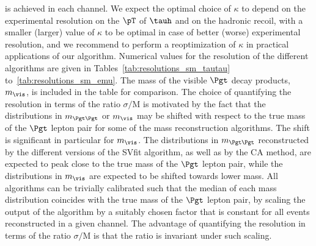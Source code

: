 is achieved in each channel.
We expect the optimal choice of $\kappa$ to depend on the experimental resolution on the $\pT$ of $\tauh$ and on the hadronic recoil,
with a smaller (larger) value of $\kappa$ to be optimal in case of better (worse) experimental resolution,
and we recommend to perform a reoptimization of $\kappa$ in practical applications of our algorithm.
Numerical values for the resolution of the different algorithms are given in Tables~\ref{tab:resolutions_sm_tautau} to~\ref{tab:resolutions_sm_emu}.
The mass of the visible $\Pgt$ decay products, $m_{\vis}$, is included in the table for comparison.
The choice of quantifying the resolution in terms of the ratio $\sigma/\textrm{M}$ is motivated 
by the fact that the distributions in $m_{\Pgt\Pgt}$ or $m_{\vis}$ may be shifted with respect to the true mass of the $\Pgt$ lepton pair 
for some of the mass reconstruction algorithms.
The shift is significant in particular for $m_{\vis}$.
The distributions in $m_{\Pgt\Pgt}$ reconstructed by the different versions of the SVfit algorithm,
as well as by the CA method, are expected to peak close to the true mass of the $\Pgt$ lepton pair,
while the distributions in $m_{\vis}$ are expected to be shifted towards lower mass.
All algorithms can be trivially calibrated such that the median of each mass distribution coincides with the true mass of the $\Pgt$ lepton pair,
by scaling the output of the algorithm by a suitably chosen factor that is constant for all events reconstructed in a given channel.
The advantage of quantifying the resolution in terms of the ratio $\sigma/\textrm{M}$ is that the ratio
is invariant under such scaling.

